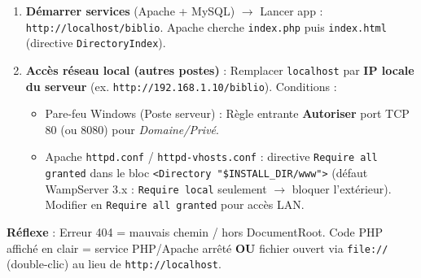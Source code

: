 \documentclass[11pt]{article}
\begin{document}
\begin{methode}
\begin{enumerate}
\begin{lstlisting}[language=Php]
$dsn = "mysql:host=$host;dbname=$dbname;charset=$charset";
$options = [
    PDO::ATTR_ERRMODE            => PDO::ERRMODE_EXCEPTION,
    PDO::ATTR_DEFAULT_FETCH_MODE => PDO::FETCH_ASSOC,
    PDO::ATTR_EMULATE_PREPARES   => false,
];
try {
    $pdo = new PDO($dsn, $user, $pass, $options);
} catch (\PDOException $e) {
    throw new \PDOException($e->getMessage(), (int)$e->getCode());
}
\end{lstlisting}
\item \textbf{Démarrer services} (Apache + MySQL) $\rightarrow$ Lancer app : \texttt{http://localhost/biblio}. Apache cherche \texttt{index.php} puis \texttt{index.html} (directive \texttt{DirectoryIndex}).
\item \textbf{Accès réseau local (autres postes)} : Remplacer \texttt{localhost} par \textbf{IP locale du serveur} (ex. \texttt{http://192.168.1.10/biblio}). Conditions :
\begin{itemize}
\item Pare-feu Windows (Poste serveur) : Règle entrante \textbf{Autoriser} port TCP 80 (ou 8080) pour \emph{Domaine/Privé}.
\item Apache \texttt{httpd.conf} / \texttt{httpd-vhosts.conf} : directive \texttt{Require all granted} dans le bloc \texttt{<Directory "\${INSTALL\_DIR}/www">} (défaut WampServer 3.x : \texttt{Require local} seulement $\rightarrow$ bloquer l'extérieur). Modifier en \texttt{Require all granted} pour accès LAN.
\end{itemize}
\end{enumerate}
\textbf{Réflexe} : Erreur 404 = mauvais chemin / hors DocumentRoot. Code PHP affiché en clair = service PHP/Apache arrêté \textbf{OU} fichier ouvert via \texttt{file://} (double-clic) au lieu de \texttt{http://localhost}.
\end{methode}
\end{document}
